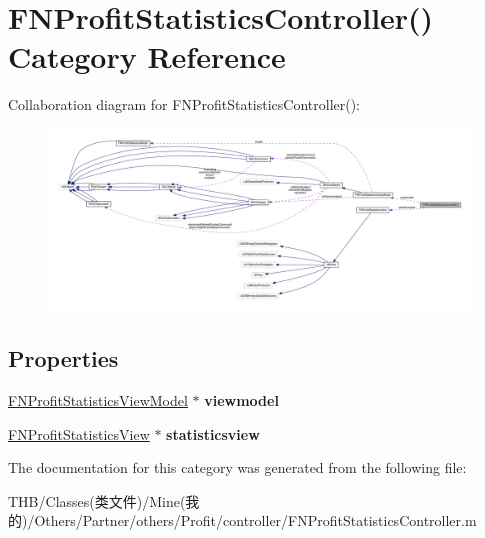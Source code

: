 \hypertarget{category_f_n_profit_statistics_controller_07_08}{}\section{F\+N\+Profit\+Statistics\+Controller() Category Reference}
\label{category_f_n_profit_statistics_controller_07_08}


Collaboration diagram for F\+N\+Profit\+Statistics\+Controller()\+:\nopagebreak
\begin{figure}[H]
\begin{center}
\leavevmode
\includegraphics[width=350pt]{category_f_n_profit_statistics_controller_07_08__coll__graph}
\end{center}
\end{figure}
\subsection*{Properties}
\begin{DoxyCompactItemize}
\item 
\mbox{\label{category_f_n_profit_statistics_controller_07_08_a0c9c12571fa3f0d83e391baa3d80ff10}} 
\mbox{\hyperlink{interface_f_n_profit_statistics_view_model}{F\+N\+Profit\+Statistics\+View\+Model}} $\ast$ {\bfseries viewmodel}
\item 
\mbox{\label{category_f_n_profit_statistics_controller_07_08_ab2abf6dd0341a78ec8a6a6488f135629}} 
\mbox{\hyperlink{interface_f_n_profit_statistics_view}{F\+N\+Profit\+Statistics\+View}} $\ast$ {\bfseries statisticsview}
\end{DoxyCompactItemize}


The documentation for this category was generated from the following file\+:\begin{DoxyCompactItemize}
\item 
T\+H\+B/\+Classes(类文件)/\+Mine(我的)/\+Others/\+Partner/others/\+Profit/controller/F\+N\+Profit\+Statistics\+Controller.\+m\end{DoxyCompactItemize}
